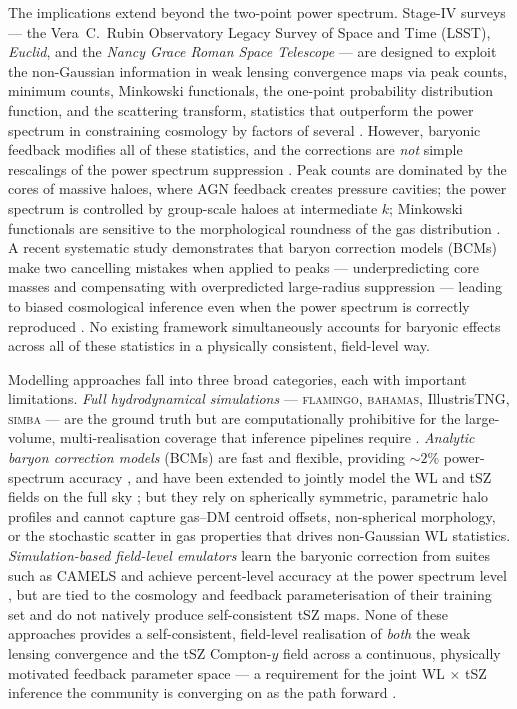 \documentclass[linenumbers,trackchanges, twocolumn]{aastex701}
\begin{document}
The implications extend beyond the two-point power spectrum.
Stage-IV surveys --- the Vera~C.\ Rubin Observatory Legacy Survey of Space
and Time (LSST), \textit{Euclid}, and the \textit{Nancy Grace Roman Space
Telescope} --- are designed to exploit the non-Gaussian information in weak
lensing convergence maps via peak counts, minimum counts, Minkowski
functionals, the one-point probability distribution function, and the
scattering transform, statistics that outperform the power spectrum in
constraining cosmology by factors of several
\citep{Zuercher-2021,Martinet-2021,HarnoisDeraps-2021,Gatti-2022,Zuercher-2022,Marques-2024}.
However, baryonic feedback modifies all of these statistics, and the
corrections are \emph{not} simple rescalings of the power spectrum suppression
\citep{Osato-2021,Coulton-2020,Broxterman-2024,Grandon-2024}.
Peak counts are dominated by the cores of massive haloes, where AGN feedback
creates pressure cavities; the power spectrum is controlled by group-scale
haloes at intermediate $k$; Minkowski functionals are sensitive to the
morphological roundness of the gas distribution \citep{vanDaalen-2020,
Kratochvil-2012,Broxterman-2024,Marinichenko-2025}.
A recent systematic study demonstrates that baryon correction models (BCMs)
make two cancelling mistakes when applied to peaks --- underpredicting core
masses and compensating with overpredicted large-radius suppression --- leading
to biased cosmological inference even when the power spectrum is correctly
reproduced \citep{Lee-2026a}.
No existing framework simultaneously accounts for baryonic effects across all
of these statistics in a physically consistent, field-level way.

Modelling approaches fall into three broad categories, each with important
limitations.
\textit{Full hydrodynamical simulations} --- \textsc{flamingo}, \textsc{bahamas},
IllustrisTNG, \textsc{simba} --- are the ground truth but are computationally
prohibitive for the large-volume, multi-realisation coverage that inference
pipelines require \citep{Schaye-2023,VillaescusaNavarro-2021}.
\textit{Analytic baryon correction models} (BCMs) are fast and flexible,
providing $\sim2\%$ power-spectrum accuracy \citep{Schneider-2015,
Schneider-2019,Schneider-2025}, and have been extended to
jointly model the WL and tSZ fields on the full sky \citep{Anbajagane-2024,Zhou-2025};
but they rely on spherically symmetric, parametric halo profiles and cannot
capture gas--DM centroid offsets, non-spherical morphology, or the stochastic
scatter in gas properties that drives non-Gaussian WL statistics.
\textit{Simulation-based field-level emulators} learn the baryonic correction
from suites such as CAMELS and achieve percent-level accuracy at the power
spectrum level \citep{Sharma-2024,Arico-2021}, but are tied to the
cosmology and feedback parameterisation of their training set and do not
natively produce self-consistent tSZ maps.
None of these approaches provides a self-consistent, field-level realisation of
\emph{both} the weak lensing convergence and the tSZ Compton-$y$ field across
a continuous, physically motivated feedback parameter space --- a requirement
for the joint WL$\,\times\,$tSZ inference the community is converging on as
the path forward \citep{Bigwood-2024,Pandey-2022,Pandey-2025,Preston-2023}.
\end{document}
